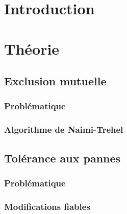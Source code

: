 \documentclass[a4paper,french,towsides,10pt]{book}
\begin{document}
\renewcommand{\labelitemii}{\textasteriskcentered}

\dominitoc

\clearemptydoublepage

\tableofcontents
\clearemptydoublepage


\chapter*{Introduction}


\chapter{Théorie}

\section{Exclusion mutuelle}
\subsection{Problématique}

\subsection{Algorithme de Naimi-Trehel}


\section{Tolérance aux pannes}
\subsection{Problématique}

\subsection{Modifications fiables}

\end{document}
